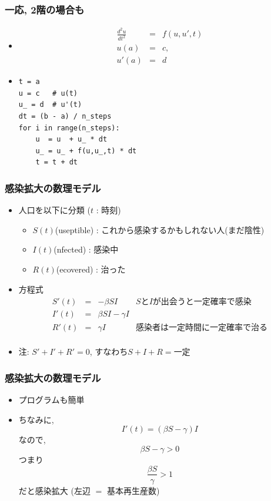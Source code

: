 \documentclass[12pt,dvipdfmx]{beamer}
\begin{document}
\begin{frame}[fragile]
\frametitle{一応, 2階の場合も}
\begin{itemize}
\item [] 
  \begin{eqnarray*}
\frac{d^2u}{dt^2} & = & f(u, u', t) \\
u(a) & = & c, \\
u'(a) & = & d
  \end{eqnarray*}

\item []

\begin{lstlisting}
t = a
u = c   # u(t)
u_ = d  # u'(t)
dt = (b - a) / n_steps
for i in range(n_steps):
    u  = u  + u_ * dt
    u_ = u_ + f(u,u_,t) * dt
    t = t + dt
\end{lstlisting}

\end{itemize}
\end{frame}
\fi


\begin{frame}[fragile]
\frametitle{感染拡大の数理モデル}
\begin{itemize}
\item 人口を以下に分類 ($t$ : 時刻)
  \begin{itemize}
  \item $S(t)$(useptible) : これから感染するかもしれない人(まだ陰性)
  \item $I(t)$(nfected) : 感染中
  \item $R(t)$(ecovered) : 治った
  \end{itemize}
\item 方程式
\[\begin{array}{rcll}
    S'(t) & = & -\beta S I & \mbox{$S$と$I$が出会うと一定確率で感染} \\
    I'(t) & = & \beta S I - \gamma I \\
    R'(t) & = & \gamma I & \mbox{感染者は一定時間に一定確率で治る} \\
  \end{array}\]
\item 注: $S' + I' + R' = 0$, すなわち$S + I + R =$一定
\end{itemize}
\end{frame}


\begin{frame}[fragile]
\frametitle{感染拡大の数理モデル}
\begin{itemize}
\item プログラムも簡単
\item ちなみに,
  \[ I'(t) = (\beta S - \gamma) I \]
  なので,
  \[ \beta S - \gamma > 0 \]
  つまり
  \[ \frac{\beta S}{\gamma} > 1 \]
  だと感染拡大 (左辺 $=$ 基本再生産数)
\end{itemize}
\end{frame}
\end{document}
